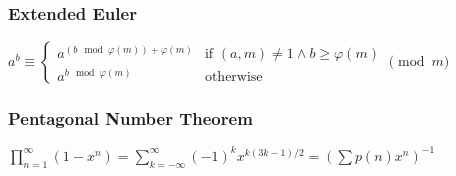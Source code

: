 \subsubsection{Extended Euler}
\(
a^b \equiv \begin{cases}
 a^{(b \mod{\varphi(m)}) + \varphi(m)}& \text{if } (a, m) \neq 1 \land b \geq \varphi(m) \\
 a^{b \mod{\varphi(m)}} & \text{otherwise}
\end{cases}
\pmod{m}
\)

\subsubsection{Pentagonal Number Theorem}
\(
\prod _{n=1}^{\infty }\left(1-x^{n}\right)=\sum _{k=-\infty }^{\infty }\left(-1\right)^{k}x^{k\left(3k-1\right)/2}=
\left(\sum p(n) x^n\right)^{-1}
\)
